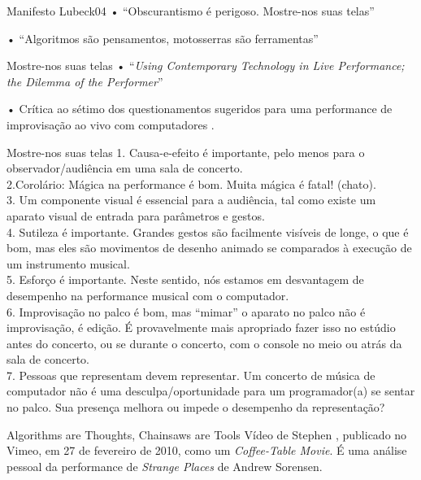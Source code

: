\documentclass[aspectratio=169]{beamer}
\begin{document}
\begin{frame}{Manifesto Lubeck04}
• ``Obscurantismo é perigoso. Mostre-nos suas telas''

• ``Algoritmos são pensamentos, motosserras são ferramentas''
\end{frame}

\begin{frame}{Mostre-nos suas telas}
• ``\emph{Using Contemporary Technology in Live Performance; the Dilemma of the Performer}'' \cite{schloss_dilemma_2003}

• Crítica ao sétimo dos questionamentos sugeridos para uma performance de improvisação ao vivo com computadores .
\end{frame}

\begin{frame}[allowframebreaks]{Mostre-nos suas telas}
1. Causa-e-efeito é importante, pelo menos para o observador/audiência em uma sala de concerto. 
\ \\
2.Corolário: Mágica na performance é bom. Muita mágica é fatal! (chato).
\ \\
3. Um componente visual é essencial para a audiência, tal como existe um aparato visual de entrada para parâmetros e gestos.
\ \\
4. Sutileza é importante. Grandes gestos são facilmente visíveis de longe, o que é bom, mas eles são movimentos de desenho animado se comparados à execução de um instrumento musical.
\ \\
5. Esforço é importante. Neste sentido, nós estamos em desvantagem de desempenho na performance musical com o computador.
\ \\
6. Improvisação no palco é bom, mas ``mimar'' o aparato no palco não é improvisação, é edição. É provavelmente mais apropriado fazer isso no estúdio antes do concerto, ou se durante o concerto, com o console no meio ou atrás da sala de concerto.
\ \\
7. Pessoas que representam devem representar. Um concerto de música de computador não é uma desculpa/oportunidade para um programador(a) se sentar no palco. Sua presença melhora ou impede o desempenho da representação?
\end{frame}

\begin{frame}{Algorithms are Thoughts, Chainsaws are Tools}
Vídeo de Stephen , publicado no Vimeo, em  27 de fevereiro de 2010, como um \emph{Coffee-Table Movie}. É uma análise pessoal da performance de \emph{Strange Places} de Andrew Sorensen.
\end{frame}
\end{document}
